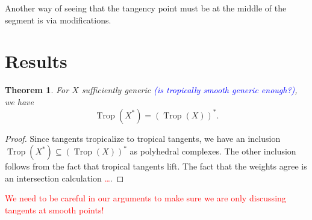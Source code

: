 \documentclass[oneside]{amsart}
\DeclareMathOperator{\trop}{Trop}
\newtheorem{thm}{Theorem}[section]
\theoremstyle{definition}
\newcommand{\nathan}[1]{\textcolor{red}{#1}}
\newcommand{\yoav}[1]{\textcolor{blue}{#1}}
\begin{document}
Another way of seeing that the tangency point must be at the middle of the segment is via modifications. 


\section{Results}
\begin{thm}\label{thm:tropdual}
For $X$ sufficiently generic \yoav{(is tropically smooth generic enough?)}, we have
\[
\trop(X^*)=(\trop(X))^*.
\]
\end{thm}
\begin{proof}
Since tangents tropicalize to tropical tangents, we have an inclusion $\trop(X^*)\subseteq(\trop(X))^*$ as polyhedral complexes. The other inclusion follows from the fact that tropical tangents lift. The fact that the weights agree is an intersection calculation \nathan{\ldots}. 
\end{proof}
\nathan{We need to be careful in our arguments to make sure we are only discussing tangents at smooth points!}
\end{document}

